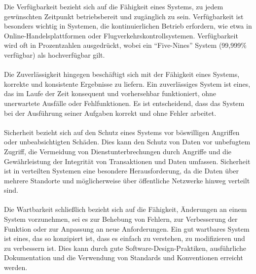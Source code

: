 \documentclass[../vs-script-first-v01.tex]{subfiles}
\begin{document}
Die Verfügbarkeit bezieht sich auf die Fähigkeit eines Systems, zu jedem gewünschten Zeitpunkt betriebsbereit und zugänglich zu sein. Verfügbarkeit ist besonders wichtig in Systemen, die kontinuierlichen Betrieb erfordern, wie etwa in Online-Handelsplattformen oder Flugverkehrskontrollsystemen. Verfügbarkeit wird oft in Prozentzahlen ausgedrückt, wobei ein \enquote{Five-Nines} System (99,999\% verfügbar) als hochverfügbar gilt.
\\\\
Die Zuverlässigkeit hingegen beschäftigt sich mit der Fähigkeit eines Systems, korrekte und konsistente Ergebnisse zu liefern. Ein zuverlässiges System ist eines, das im Laufe der Zeit konsequent und vorhersehbar funktioniert, ohne unerwartete Ausfälle oder Fehlfunktionen. Es ist entscheidend, dass das System bei der Ausführung seiner Aufgaben korrekt und ohne Fehler arbeitet.
\\\\
Sicherheit bezieht sich auf den Schutz eines Systems vor böswilligen Angriffen oder unbeabsichtigten Schäden. Dies kann den Schutz von Daten vor unbefugtem Zugriff, die Vermeidung von Dienstunterbrechungen durch Angriffe und die Gewährleistung der Integrität von Transaktionen und Daten umfassen. Sicherheit ist in verteilten Systemen eine besondere Herausforderung, da die Daten über mehrere Standorte und möglicherweise über öffentliche Netzwerke hinweg verteilt sind.
\\\\
Die Wartbarkeit schließlich bezieht sich auf die Fähigkeit, Änderungen an einem System vorzunehmen, sei es zur Behebung von Fehlern, zur Verbesserung der Funktion oder zur Anpassung an neue Anforderungen. Ein gut wartbares System ist eines, das so konzipiert ist, dass es einfach zu verstehen, zu modifizieren und zu verbessern ist. Dies kann durch gute Software-Design-Praktiken, ausführliche Dokumentation und die Verwendung von Standards und Konventionen erreicht werden.
\end{document}
